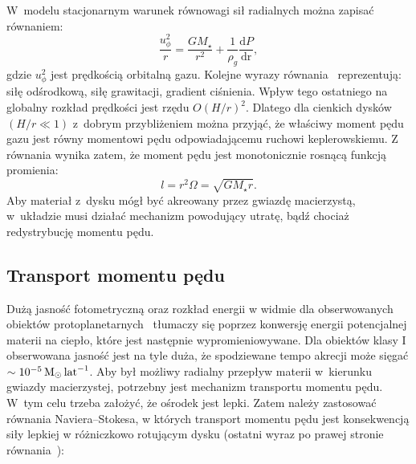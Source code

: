 %
\par W~modelu stacjonarnym warunek równowagi sił radialnych można zapisać
równaniem:
%
\begin{equation}\label{eq:radial_balance}
\frac{u_\phi^2}{r} = \frac{GM_\star}{r^2} +
  \frac{1}{\rho_g}\frac{\textrm{d}P}{\textrm{dr}},
\end{equation}
gdzie $u_\phi^2$ jest prędkością orbitalną gazu.  Kolejne wyrazy
równania~ reprezentują: siłę odśrodkową, siłę
grawitacji, gradient ciśnienia. Wpływ tego ostatniego na globalny rozkład
prędkości jest rzędu $O(H/r)^2$. Dlatego dla cienkich dysków $(H/r \ll 1)$
z~dobrym przybliżeniem można przyjąć, że właściwy moment pędu gazu jest równy
momentowi pędu odpowiadającemu ruchowi keplerowskiemu. Z równania
 wynika zatem, że moment pędu jest monotonicznie rosnącą
funkcją promienia:
%
\begin{equation}\label{eq:angmom}
l = r^2\Omega = \sqrt{GM_\star r}.
\end{equation}
%
Aby materiał z~dysku mógł być akreowany przez gwiazdę macierzystą, w~układzie
musi działać mechanizm powodujący utratę, bądź chociaż redystrybucję momentu
pędu.

\subsection{Transport momentu pędu}
Dużą jasność fotometryczną oraz rozkład energii w widmie dla obserwowanych
obiektów protoplanetarnych~\citep{MME04} tłumaczy się poprzez konwersję energii
potencjalnej materii na ciepło, które jest następnie wypromieniowywane. Dla
obiektów klasy I obserwowana jasność jest na tyle duża, że spodziewane tempo
akrecji może sięgać $\sim 10^{-5}\hbox{$\mathrm{\thinspace M_{\odot}}$}\hbox{$\thinspace\textrm{lat}$}^{-1}$.  Aby był możliwy radialny
przepływ materii w~kierunku gwiazdy macierzystej, potrzebny jest mechanizm
transportu momentu pędu. W~tym celu trzeba założyć, że ośrodek jest lepki. Zatem
należy zastosować równania Naviera--Stokesa, w których transport momentu pędu
jest konsekwencją siły lepkiej w różniczkowo rotującym dysku (ostatni wyraz po
prawej stronie równania~):

